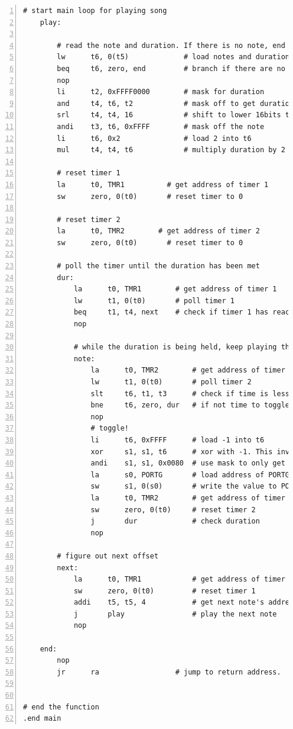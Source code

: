 \documentclass[11pt]{article}
\begin{document}
\begin{lstlisting}[numbers=left,basicstyle=\footnotesize]
    # start main loop for playing song
    play:
    
        # read the note and duration. If there is no note, end
        lw      t6, 0(t5)             # load notes and duration into algebra register
        beq     t6, zero, end         # branch if there are no more notes
        nop
        li      t2, 0xFFFF0000        # mask for duration
        and     t4, t6, t2            # mask off to get duration
        srl     t4, t4, 16            # shift to lower 16bits to get duration
        andi    t3, t6, 0xFFFF        # mask off the note
        li      t6, 0x2               # load 2 into t6
        mul     t4, t4, t6            # multiply duration by 2

        # reset timer 1
        la      t0, TMR1          # get address of timer 1
        sw      zero, 0(t0)       # reset timer to 0

        # reset timer 2
        la      t0, TMR2        # get address of timer 2
        sw      zero, 0(t0)       # reset timer to 0

        # poll the timer until the duration has been met
        dur:
            la      t0, TMR1        # get address of timer 1
            lw      t1, 0(t0)       # poll timer 1
            beq     t1, t4, next    # check if timer 1 has reached duration
            nop

            # while the duration is being held, keep playing the notes
            note:
                la      t0, TMR2        # get address of timer 2
                lw      t1, 0(t0)       # poll timer 2
                slt     t6, t1, t3      # check if time is less than the period
                bne     t6, zero, dur   # if not time to toggle speaker, check duration
                nop
                # toggle!
                li      t6, 0xFFFF      # load -1 into t6
                xor     s1, s1, t6      # xor with -1. This inverts all the bits
                andi    s1, s1, 0x0080  # use mask to only get RG7
                la      s0, PORTG       # load address of PORTG
                sw      s1, 0(s0)       # write the value to PORTG.
                la      t0, TMR2        # get address of timer 2
                sw      zero, 0(t0)     # reset timer 2
                j       dur             # check duration
                nop

        # figure out next offset
        next:
            la      t0, TMR1            # get address of timer 1
            sw      zero, 0(t0)         # reset timer 1
            addi    t5, t5, 4           # get next note's address
            j       play                # play the next note
            nop

    end:
        nop
        jr      ra                  # jump to return address.


# end the function
.end main
\end{lstlisting}
\end{document}
